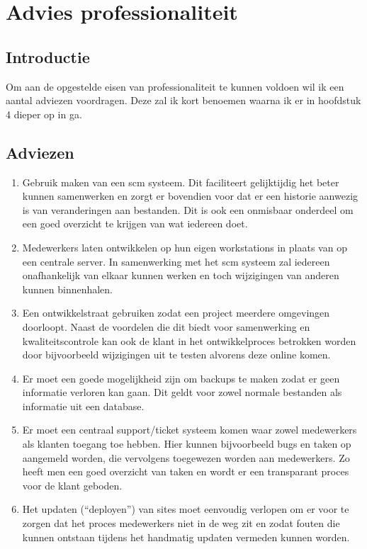 \chapter{Advies professionaliteit}

\section{Introductie}

Om aan de opgestelde eisen van professionaliteit te kunnen voldoen wil ik een aantal adviezen voordragen. Deze zal ik kort benoemen waarna ik er in hoofdstuk 4 dieper op in ga.

\section{Adviezen}

\begin{enumerate}
  \item Gebruik maken van een {\sc scm} systeem. Dit faciliteert gelijktijdig het beter kunnen samenwerken en zorgt er bovendien voor dat er een historie aanwezig is van veranderingen aan bestanden. Dit is ook een onmisbaar onderdeel om een goed overzicht te krijgen van wat iedereen doet.
  \item Medewerkers laten ontwikkelen op hun eigen workstations in plaats van op een centrale server. In samenwerking met het {\sc scm} systeem zal iedereen onafhankelijk van elkaar kunnen werken en toch wijzigingen van anderen kunnen binnenhalen.
  \item Een ontwikkelstraat gebruiken zodat een project meerdere omgevingen doorloopt. Naast de voordelen die dit biedt voor samenwerking en kwaliteitscontrole kan ook de klant in het ontwikkelproces betrokken worden door bijvoorbeeld wijzigingen uit te testen alvorens deze online komen.
  \item Er moet een goede mogelijkheid zijn om backups te maken zodat er geen informatie verloren kan gaan. Dit geldt voor zowel normale bestanden als informatie uit een database.
  \item Er moet een centraal support/ticket systeem komen waar zowel medewerkers als klanten toegang toe hebben. Hier kunnen bijvoorbeeld bugs en taken op aangemeld worden, die vervolgens toegewezen worden aan medewerkers. Zo heeft men een goed overzicht van taken en wordt er een transparant proces voor de klant geboden.
  \item Het updaten (``deployen'') van sites moet eenvoudig verlopen om er voor te zorgen dat het proces medewerkers niet in de weg zit en zodat fouten die kunnen ontstaan tijdens het handmatig updaten vermeden kunnen worden.
  
\end{enumerate}
